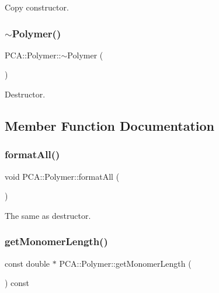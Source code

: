 Copy constructor. 

\hypertarget{class_p_c_a_1_1_polymer_ac0d31fa5c6bee720f8069805d6669606}{}\label{class_p_c_a_1_1_polymer_ac0d31fa5c6bee720f8069805d6669606} 
\subsubsection{\texorpdfstring{$\sim$\+Polymer()}{~Polymer()}}
{\footnotesize\ttfamily P\+C\+A\+::\+Polymer\+::$\sim$\+Polymer (\begin{DoxyParamCaption}{ }\end{DoxyParamCaption})}



Destructor. 



\subsection{Member Function Documentation}
\hypertarget{class_p_c_a_1_1_polymer_a3fcca4084a54ac8bc1941b36462bc560}{}\label{class_p_c_a_1_1_polymer_a3fcca4084a54ac8bc1941b36462bc560} 
\subsubsection{\texorpdfstring{format\+All()}{formatAll()}}
{\footnotesize\ttfamily void P\+C\+A\+::\+Polymer\+::format\+All (\begin{DoxyParamCaption}{ }\end{DoxyParamCaption})\hspace{0.3cm}{\ttfamily [private]}}



The same as destructor. 

\hypertarget{class_p_c_a_1_1_polymer_af05e598bcd1e9987aca46d0661ac6dca}{}\label{class_p_c_a_1_1_polymer_af05e598bcd1e9987aca46d0661ac6dca} 
\subsubsection{\texorpdfstring{get\+Monomer\+Length()}{getMonomerLength()}}
{\footnotesize\ttfamily const double $\ast$ P\+C\+A\+::\+Polymer\+::get\+Monomer\+Length (\begin{DoxyParamCaption}{ }\end{DoxyParamCaption}) const}

